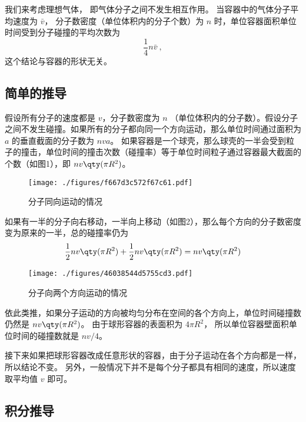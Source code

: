 
\begin{issues}
\issueTODO
\end{issues}


我们来考虑理想气体， 即气体分子之间不发生相互作用。 当容器中的气体分子平均速度为 $\bar v$， 分子数密度（单位体积内的分子个数）为 $n$ 时，单位容器面积单位时间受到分子碰撞的平均次数为
\begin{equation}
\frac14 n\bar v~,
\end{equation}
这个结论与容器的形状无关。

\subsection{简单的推导}

假设所有分子的速度都是 $v$，分子数密度为 $n$ （单位体积内的分子数）。假设分子之间不发生碰撞。如果所有的分子都向同一个方向运动，那么单位时间通过面积为 $a$ 的垂直截面的分子数为 $nva$。 如果容器是一个球壳，那么球壳的一半会受到粒子的撞击，单位时间的撞击次数（碰撞率）等于单位时间粒子通过容器最大截面的个数（如图1），即 $nv \qty(\pi R^2)$。 
\begin{figure}[ht]
\centering
\texttt{[image: ./figures/f667d3c572f67c61.pdf]}
\caption{分子同向运动的情况} \label{fig_AvgHit_1}
\end{figure}
如果有一半的分子向右移动，一半向上移动（如图2），那么每个方向的分子数密度变为原来的一半，总的碰撞率仍为
\begin{equation}
\frac12 nv \qty(\pi R^2) + \frac12 nv \qty(\pi R^2) = nv \qty(\pi R^2)
\end{equation}

\begin{figure}[ht]
\centering
\texttt{[image: ./figures/46038544d5755cd3.pdf]}
\caption{分子向两个方向运动的情况} \label{fig_AvgHit_2}
\end{figure}
依此类推，如果分子运动的方向被均匀分布在空间的各个方向上，单位时间碰撞数仍然是 $nv \qty(\pi R^2)$。
由于球形容器的表面积为 $4\pi R^2$， 所以单位容器壁面积单位时间的碰撞数就是 $nv/4$。 

接下来如果把球形容器改成任意形状的容器，由于分子运动在各个方向都是一样，所以结论不变。 另外，一般情况下并不是每个分子都具有相同的速度，所以速度取平均值 $v$ 即可。

\subsection{积分推导}

